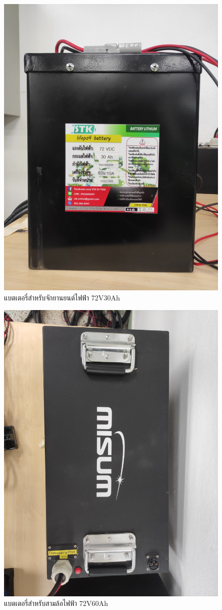\begin{center}
	\begin{figure}[H]
		\includegraphics[width=0.5\linewidth]{Chapters/img/Battery_72V30Ah.jpg}
		\centering
		\captionsetup{justification=centering,margin=2cm}
		\caption{แบตเตอรี่สำหรับจักยานยนต์ไฟฟ้า 72V30Ah}
		\label{fig:Battery_72V30Ah}
	\end{figure}
	\begin{figure}[H]
		\includegraphics[width=0.5\linewidth]{Chapters/img/Battery_72V60Ah.jpg}
		\centering
		\captionsetup{justification=centering,margin=2cm}
		\caption{แบตเตอรี่สำหรับสามล้อไฟฟ้า 72V60Ah}
		\label{fig:Battery_72V60Ah}

\end{figure}
\end{center}
